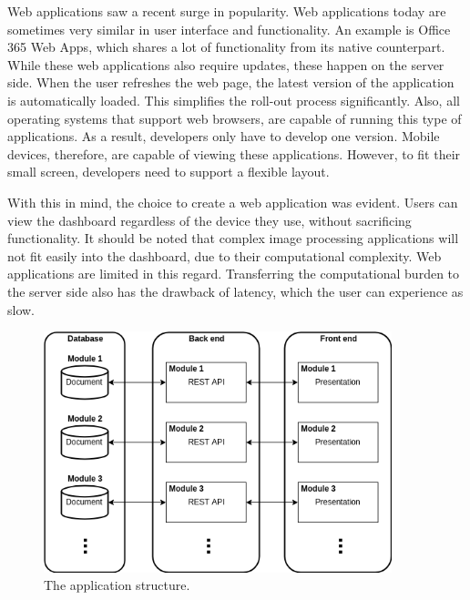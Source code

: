     Web applications saw a recent surge in popularity. Web applications today are sometimes very similar in user interface and functionality. An example is Office 365 Web Apps, which shares a lot of functionality from its native counterpart. While these web applications also require updates, these happen on the server side. When the user refreshes the web page, the latest version of the application is automatically loaded. This simplifies the roll-out process significantly. Also, all operating systems that support web browsers, are capable of running this type of applications. As a result, developers only have to develop one version. Mobile devices, therefore, are capable of viewing these applications. However, to fit their small screen, developers need to support a flexible layout.

    With this in mind, the choice to create a web application was evident. Users can view the dashboard regardless of the device they use, without sacrificing functionality. It should be noted that complex image processing applications will not fit easily into the dashboard, due to their computational complexity. Web applications are limited in this regard. Transferring the computational burden to the server side also has the drawback of latency, which the user can experience as slow.

    \begin{figure}[!t]
        \centering
        \includegraphics[width=0.9\textwidth]{chapters/4_implementation/structure}
        \caption{The application structure.}\label{fig:structure}
    \end{figure}

